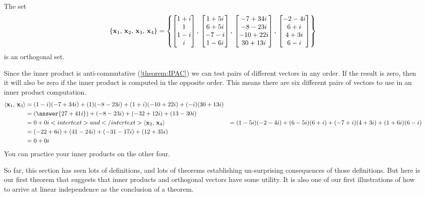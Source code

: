 \documentclass{ximera}
\begin{document}
\begin{example}

The set
\[
\left\{\mathbf{x}_1,\,\mathbf{x}_2,\,\mathbf{x}_3,\,\mathbf{x}_4\right\}=
\left\{
\begin{bmatrix}1+i\\1\\1-i\\i\end{bmatrix},\,
\begin{bmatrix}1+5i\\6+5i\\-7-i\\1-6i\end{bmatrix},\,
\begin{bmatrix}-7+34i\\-8-23i\\-10+22i\\30+13i\end{bmatrix},\,
\begin{bmatrix}-2-4i\\6+i\\4+3i\\6-i\end{bmatrix}
\right\}
\]
is an orthogonal set.


Since the inner product is anti-commutative (\ref{theorem:IPAC}) we can test pairs of different vectors in any order.  If the result is zero, then it will also be zero if the inner product is computed in the opposite order.  This means there are six different pairs of vectors to use in an inner product computation.
\begin{align*}
\innerproduct{\vect{x}_1}{\vect{x}_3}&=
(1-i)(-7+34i)+(1)(-8-23i)+(1+i)(-10+22i)+(-i)(30+13i)\\
&=(\answer{27+41i})+(-8-23i)+(-32+12i)+(13-30i)\\
&=0+0i
<intertext>and</intertext>
\innerproduct{\vect{x}_2}{\vect{x}_4}&=
(1-5i)(-2-4i)+(6-5i)(6+i)+(-7+i)(4+3i)+(1+6i)(6-i)\\
&=(-22+6i)+(41-24i)+(-31-17i)+(12+35i)\\
&=0+0i
\end{align*}
You can practice your inner products on the other four.

\end{example}

So far, this section has seen lots of definitions, and lots of
theorems establishing un-surprising consequences of those definitions.
But here is our first theorem that suggests that inner products and
orthogonal vectors have some utility.  It is also one of our first
illustrations of how to arrive at linear independence as the
conclusion of a theorem.
\end{document}
